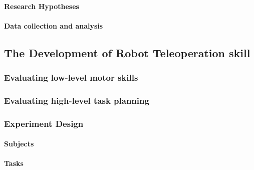\paragraph{Research Hypotheses}


\paragraph{Data collection and analysis}

\subsection{The Development of Robot Teleoperation skill }\label{sec:plan-skill}

\subsubsection{Evaluating low-level motor skills}\label{sec:plan-skill-low}

\subsubsection{Evaluating high-level task planning}\label{sec:plan-skill-high}

\subsubsection{Experiment Design}\label{sec:plan-skill-exp}

\paragraph{Subjects}

\paragraph{Tasks}


